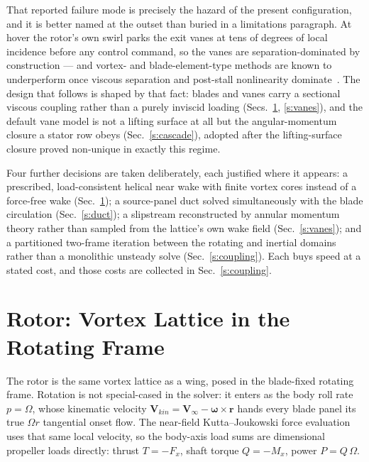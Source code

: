 \documentclass[]{aiaa-tc}%
\begin{document}
That reported failure mode is precisely the hazard of the present
configuration, and it is better named at the outset than buried in a
limitations paragraph. At hover the rotor's own swirl parks the exit
vanes at tens of degrees of local incidence before any control
command, so the vanes are separation-dominated by construction --- and
vortex- and blade-element-type methods are known to underperform once
viscous separation and post-stall nonlinearity
dominate~\cite{lee2022}. The design that follows is shaped by that
fact: blades and vanes carry a sectional viscous coupling rather than
a purely inviscid loading (Secs.~\ref{s:rotor}, \ref{s:vanes}), and
the default vane model is not a lifting surface at all but the
angular-momentum closure a stator row obeys (Sec.~\ref{s:cascade}),
adopted after the lifting-surface closure proved non-unique in exactly
this regime.

Four further decisions are taken deliberately, each justified where it
appears: a prescribed, load-consistent helical near wake with finite
vortex cores instead of a force-free wake (Sec.~\ref{s:rotor}); a
source-panel duct solved simultaneously with the blade circulation
(Sec.~\ref{s:duct}); a slipstream reconstructed by annular momentum
theory rather than sampled from the lattice's own wake field
(Sec.~\ref{s:vanes}); and a partitioned two-frame iteration between
the rotating and inertial domains rather than a monolithic unsteady
solve (Sec.~\ref{s:coupling}). Each buys speed at a stated cost, and
those costs are collected in Sec.~\ref{s:coupling}.

\section{Rotor: Vortex Lattice in the Rotating Frame}
\label{s:rotor}

The rotor is the same vortex lattice as a wing, posed in the
blade-fixed rotating frame. Rotation is not special-cased in the
solver: it enters as the body roll rate $p = \Omega$, whose kinematic
velocity $\mathbf{V}_{kin} = \mathbf{V}_\infty -
\boldsymbol{\omega} \times \mathbf{r}$ hands every blade panel its
true $\Omega r$ tangential onset flow. The near-field
Kutta--Joukowski force evaluation uses that same local velocity, so
the body-axis load sums are dimensional propeller loads directly:
thrust $T = -F_x$, shaft torque $Q = -M_x$, power $P = Q\,\Omega$.
\end{document}
